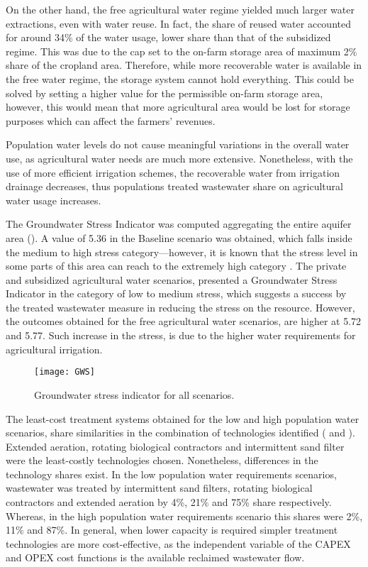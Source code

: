 On the other hand, the free agricultural water regime yielded much larger water extractions, even with water reuse. In fact, the share of reused water accounted for around 34\% of the water usage, lower share than that of the subsidized regime. This was due to the cap set to the on-farm storage area of maximum 2\% share of the cropland area. Therefore, while more recoverable water is available in the free water regime, the storage system cannot hold everything. This could be solved by setting a higher value for the permissible on-farm storage area, however, this would mean that more agricultural area would be lost for storage purposes which can affect the farmers' revenues.

Population water levels do not cause meaningful variations in the overall water use, as agricultural water needs are much more extensive. Nonetheless, with the use of more efficient irrigation schemes, the recoverable water from irrigation drainage decreases, thus populations treated wastewater share on agricultural water usage increases.

The Groundwater Stress Indicator was computed aggregating the entire aquifer area (). A value of 5.36 in the Baseline scenario was obtained, which falls inside the medium to high stress category---however, it is known that the stress level in some parts of this area can reach to the extremely high category \cite{herbertGlobalAssessmentCurrent2019}. The private and subsidized agricultural water scenarios, presented a Groundwater Stress Indicator in the category of low to medium stress, which suggests a success by the treated wastewater measure in reducing the stress on the resource. However, the outcomes obtained for the free agricultural water scenarios, are higher at 5.72 and 5.77. Such increase in the stress, is due to the higher water requirements for agricultural irrigation.

\begin{figure}[!h]
	\centering
	\texttt{[image: GWS]}
	\caption{Groundwater stress indicator for all scenarios.}
	\label{fig:gws}
\end{figure}

The least-cost treatment systems obtained for the low and high population water scenarios, share similarities in the combination of technologies identified ( and ). Extended aeration, rotating biological contractors and intermittent sand filter were the least-costly technologies chosen. Nonetheless, differences in the technology shares exist. In the low population water requirements scenarios, wastewater was treated by intermittent sand filters, rotating biological contractors and extended aeration by 4\%, 21\% and 75\% share respectively. Whereas, in the high population water requirements scenario this shares were 2\%, 11\% and 87\%. In general, when lower capacity is required simpler treatment technologies are more cost-effective, as the independent variable of the CAPEX and OPEX cost functions is the available reclaimed wastewater flow.

